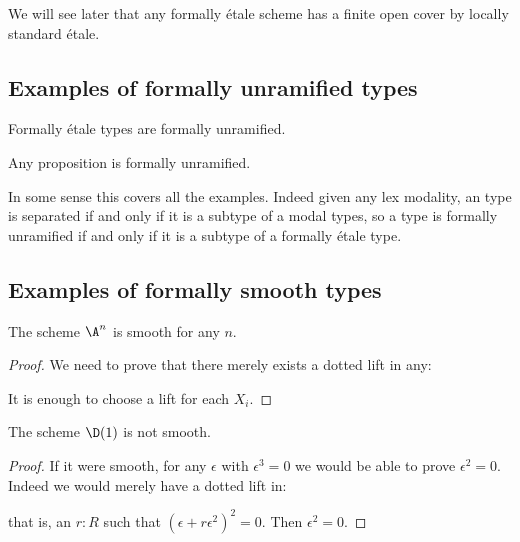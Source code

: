\begin{remark}
We will see later that any formally étale scheme has a finite open cover by locally standard étale. 
\end{remark}


\subsection{Examples of formally unramified types}

\begin{remark}
Formally étale types are formally unramified.
\end{remark}

\begin{remark}\label{prop-are-unramified}
Any proposition is formally unramified.
\end{remark}

\begin{remark}
In some sense this covers all the examples. Indeed given any lex modality, an type is separated if and only if it is a subtype of a modal types, so a type is formally unramified if and only if it is a subtype of a formally étale type. 
\end{remark}


\subsection{Examples of formally smooth types}

\begin{lemma}\label{An-is-smooth}
The scheme $\A^n$ is smooth for any $n$.
\end{lemma}

\begin{proof}
We need to prove that there merely exists a dotted lift in any:
 \begin{center}
    \end{center}
    It is enough to choose a lift for each $X_i$.
\end{proof}

\begin{lemma}
The scheme $\D(1)$ is not smooth.
\end{lemma}

\begin{proof}
If it were smooth, for any $\epsilon$ with $\epsilon^3=0$ we would be able to prove $\epsilon^2=0$.
Indeed we would merely have a dotted lift in:
 \begin{center}
    \end{center}
    that is, an $r:R$ such that $(\epsilon+r\epsilon^2)^2=0$. Then $\epsilon^2=0$.
\end{proof}

